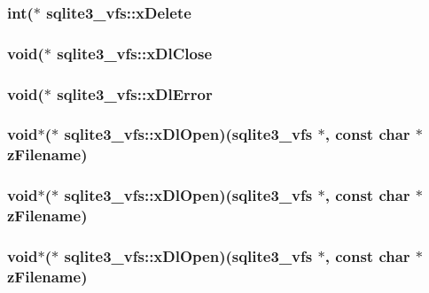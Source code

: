\subsubsection{\setlength{\rightskip}{0pt plus 5cm}int($\ast$ \bf{sqlite3\_\-vfs::x\-Delete}}\label{structsqlite3__vfs_a351120cd7d0b94aace4e02c7adfd564}


\subsubsection{\setlength{\rightskip}{0pt plus 5cm}void($\ast$ \bf{sqlite3\_\-vfs::x\-Dl\-Close}}\label{structsqlite3__vfs_972d593c1a149c48bba294641696253f}


\subsubsection{\setlength{\rightskip}{0pt plus 5cm}void($\ast$ \bf{sqlite3\_\-vfs::x\-Dl\-Error}}\label{structsqlite3__vfs_83fd60057bba8178827e02c05f97bb49}


\subsubsection{\setlength{\rightskip}{0pt plus 5cm}void$\ast$($\ast$ \bf{sqlite3\_\-vfs::x\-Dl\-Open})(\bf{sqlite3\_\-vfs} $\ast$, const char $\ast$z\-Filename)}\label{structsqlite3__vfs_6da2bf41bfd937659d09003744ea72b5}


\subsubsection{\setlength{\rightskip}{0pt plus 5cm}void$\ast$($\ast$ \bf{sqlite3\_\-vfs::x\-Dl\-Open})(\bf{sqlite3\_\-vfs} $\ast$, const char $\ast$z\-Filename)}\label{structsqlite3__vfs_6da2bf41bfd937659d09003744ea72b5}


\subsubsection{\setlength{\rightskip}{0pt plus 5cm}void$\ast$($\ast$ \bf{sqlite3\_\-vfs::x\-Dl\-Open})(\bf{sqlite3\_\-vfs} $\ast$, const char $\ast$z\-Filename)}\label{structsqlite3__vfs_6da2bf41bfd937659d09003744ea72b5}


